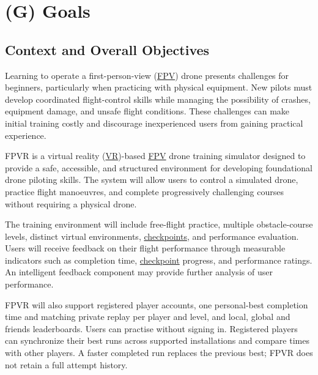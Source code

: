 \documentclass[12pt]{article}
\newcommand{\unumbered}[1]{%
  \phantomsection\section*{#1}\addcontentsline{toc}{section}{#1}}
\newcommand{\booksection}[2]{%
  \clearpage\unumbered{(#1) #2}
  \renewcommand{\thesubsection}{#1.\arabic{subsection}}
  \renewcommand{\theHsubsection}{#1.\arabic{subsection}}
  \setcounter{subsection}{0}}
\begin{document}
\listoftables

\listoffigures

\clearpage




\booksection{G}{Goals}

\subsection{Context and Overall Objectives}\label{g1}

Learning to operate a \hypertarget{gl:FPV}{}first-person-view (\hyperlink{glos:FPV}{FPV}) drone presents challenges for beginners, particularly when practicing with physical equipment. New pilots must develop coordinated flight-control skills while managing the possibility of crashes, equipment damage, and unsafe flight conditions. These challenges can make initial training costly and discourage inexperienced users from gaining practical experience.

FPVR is a \hypertarget{gl:VR}{}virtual reality (\hyperlink{glos:VR}{VR})-based \hyperlink{glos:FPV}{FPV} drone training simulator designed to provide a safe, accessible, and structured environment for developing foundational drone piloting skills. The system will allow users to control a simulated drone, practice flight manoeuvres, and complete progressively challenging courses without requiring a physical drone.

The training environment will include free-flight practice, multiple obstacle-course levels, distinct virtual environments, \hypertarget{gl:Checkpoint}{}\hyperlink{glos:Checkpoint}{checkpoints}, and performance evaluation. Users will receive 
feedback on their flight performance through measurable indicators such as completion time, \hyperlink{glos:Checkpoint}{checkpoint} progress, and performance ratings. 
An intelligent feedback component may provide further analysis of user performance.

FPVR will also support registered player accounts,
one personal-best completion time and matching private replay per player and
level, and local, global and friends leaderboards. Users can practise without
signing in. Registered players can synchronize their best runs across supported
installations and compare times with other players. A faster completed run
replaces the previous best; FPVR does not retain a full attempt history.
\end{document}
